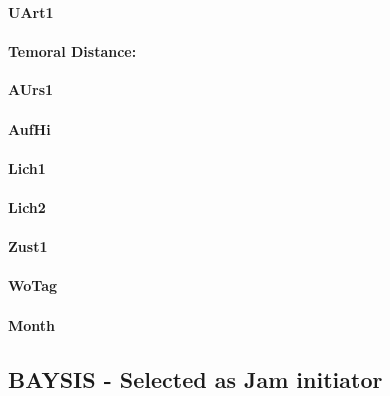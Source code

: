 \documentclass[a4paper,headsepline,footsepline,fontsize=11pt,BCOR=12mm,DIV=12]{report}
\begin{document}
\large
\centerline{\textbf{UArt1}}
\normalsize

\paragraph{Temoral Distance:}


\large
\centerline{\textbf{AUrs1}}
\normalsize

\paragraph{}

\large
\centerline{\textbf{AufHi}}
\normalsize

\paragraph{}

\large
\centerline{\textbf{Lich1}}
\normalsize

\paragraph{}

\large
\centerline{\textbf{Lich2}}
\normalsize

\paragraph{}

\large
\centerline{\textbf{Zust1}}
\normalsize

\paragraph{}

\large
\centerline{\textbf{WoTag}}
\normalsize

\paragraph{}

\large
\centerline{\textbf{Month}}
\normalsize

\paragraph{}

\subsection{BAYSIS - Selected as Jam initiator}
\end{document}
